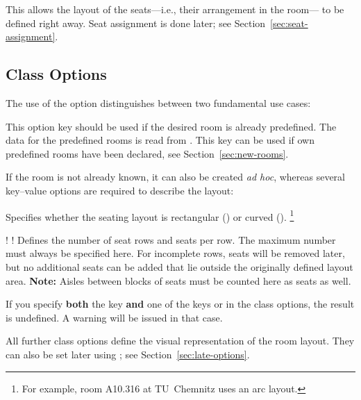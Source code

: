 \documentclass[
babel-options={english},
load-preamble-,
title=compact
]{cnltx-doc}
\begin{document}
This allows the layout of the seats—i.e., their arrangement in the room—
to be defined right away. Seat assignment is done later;
see Section~\ref{sec:seat-assignment}.

\subsection{Class Options}
\label{sec:class-options}
The use of the option  distinguishes between two fundamental use cases:
\begin{options}
   This option key should be used if the desired room
  is already predefined.
  The data for the predefined rooms is read
  from .
  This key can be used if own predefined rooms have been declared, see
  Section~\ref{sec:new-rooms}. 
\end{options}
If the room is not already known, it can also be created \emph{ad hoc}, whereas
several key–value options are required to describe the layout: 

\begin{options}
  Specifies whether the seating layout is rectangular () or curved ().%
  \footnote{For example, room A10.316 at TU~Chemnitz uses an arc layout.}

  \Default*!{}\vspace{-.3\baselineskip}
  \Default!{}
  Defines the number of seat rows and seats per row. The maximum number must always be specified here.
  For incomplete rows, seats will be removed later, but no additional seats can be added that lie outside
  the originally defined layout area.
  \textbf{Note:} Aisles between blocks of seats must be counted here as seats as well.
\end{options}

If you specify \textbf{both} the  key \textbf{and} one of the keys
 or  in the class options, the result is undefined.
A warning will be issued in that case.\medskip

All further class options define the visual representation of the room layout.
They can also be set later using ; see Section~\ref{sec:late-options}.
\end{document}
